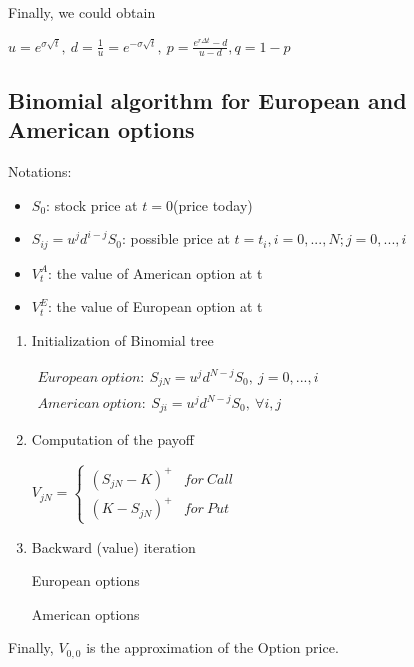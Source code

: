 \documentclass{article}
\begin{document}
Finally, we could obtain
\begin{center}
	$u=e^{\sigma \sqrt{t}} ,\  d=\frac{1}{u}=e^{-\sigma \sqrt{t}} ,\  p=\frac{e^{r\Delta t}-d}{u-d}, q = 1 - p $
\end{center}

\subsection{Binomial algorithm for European and American options}
Notations:
\begin{itemize}
	\item $S_0$: stock price at $t=0$(price today)
	\item $S_{ij}=u^{j}d^{i-j}S_{0}$: possible price at $t=t_i, i=0,..., N; j=0,...,i$
	\item $V^{A}_{t}$: the value of American option at t
	\item $V^{E}_{t}$: the value of European option at t
\end{itemize}



\begin{enumerate}[1.]
	\item Initialization of Binomial tree\begin{center}
		$\begin{gathered}European\  option:\  S_{jN}=u^{j}d^{N-j}S_{0},\  j=0,...,i\\ American\  option:\  S_{ji}=u^{j}d^{N-j}S_{0},\  \forall i,j\end{gathered} $
	\end{center}
	\item Computation of the payoff\begin{center}
		$V_{jN}=\begin{cases}\left( S_{jN}-K\right)^{+}  &for\  Call\\ \left( K-S_{jN}\right)^{+}  &for\  Put\end{cases} $
	\end{center}
	\item Backward (value) iteration\begin{algorithm}
\caption{European options}\label{algorithm}
\end{algorithm}

\begin{algorithm}
\caption{American options}\label{algorithm}
\end{algorithm}\end{enumerate}
Finally, $V_{0,0}$ is the approximation of the Option price.
\end{document}
